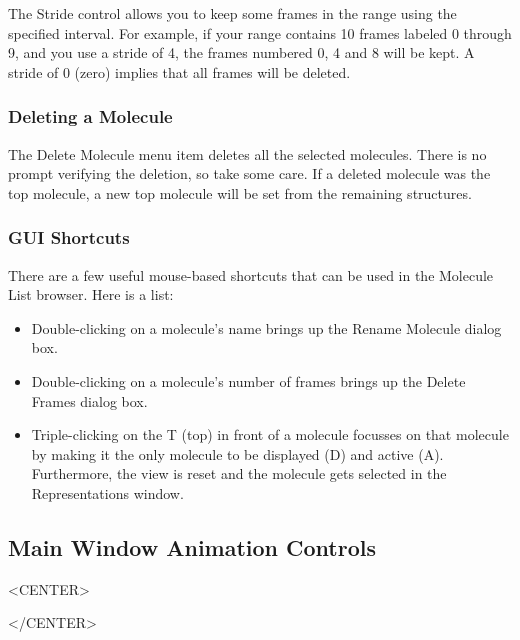 The {\sf Stride} control allows you to keep some frames in the range using the 
specified interval. For example, if your range contains 10 frames labeled 0 
through 9, and you use a stride of 4, the frames numbered 0, 4 and 8 will be kept.
A stride of 0 (zero) implies that all frames will be deleted.


\subsubsection{Deleting a Molecule}
\label{ug:ui:window:main:delete:molecule}

The {\sf Delete Molecule} menu item deletes all the selected molecules.  There
is no prompt verifying the deletion, so take some care.  If a deleted molecule
was the top molecule, a new top molecule will be set from the remaining
structures.

\subsubsection{GUI Shortcuts}
\label{ug:ui:window:main:guishortcuts}

There are a few useful mouse-based shortcuts that can be used in the Molecule List browser. Here is a list:

\begin{itemize}
\item Double-clicking on a molecule's name brings up the Rename Molecule dialog box.

\item Double-clicking on a molecule's number of frames brings up the Delete Frames dialog box.

\item Triple-clicking on the T (top) in front of a molecule focusses on that molecule by making it the only molecule to be displayed (D) and active (A). Furthermore, the view is reset and the molecule gets selected in the Representations window.
\end{itemize}
 

\subsection{Main Window Animation Controls}
\label{ug:ui:window:animate}

\begin{rawhtml}
<CENTER>
\end{rawhtml}
\begin{rawhtml}
</CENTER>
\end{rawhtml}

